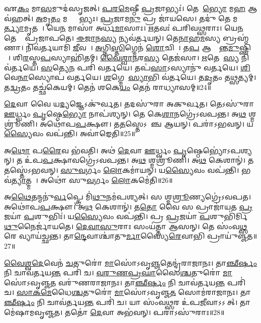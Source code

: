 𑌏\ul{𑌕𑌂} 𑌮𑌾\ul{𑌸}𑌮𑍁𑌦॑𑌸𑍃𑌜𑌤𑍍।
\ul{𑌪}\ul{𑌰}\ul{𑌮𑍇}𑌷𑍍𑌠𑍀 \ul{𑌪𑍍𑌰}𑌜𑌾𑌭𑍍𑌯𑌃॑।
𑌤𑍇𑌨𑌾᳚\ul{𑌭𑍍𑌯𑍋} 𑌮\ul{𑌹} 𑌆𑌵॑𑌹𑌤𑍍।
\ul{𑌅}𑌮𑍃\ul{𑌤𑌂} 𑌮𑌰𑍍𑌤𑍍𑌯𑌾᳚𑌭𑍍𑌯𑌃।
\ul{𑌪𑍍𑌰}𑌜𑌾𑌮\ul{𑌨𑍁} 𑌪𑍍𑌰 𑌜𑌾॑𑌯𑌸𑍇।
𑌤𑌦𑍁॑ 𑌤𑍇 𑌮\ul{𑌰𑍍𑌤𑍍𑌯𑌾}𑌮𑍃𑌤𑌮𑍍᳚।
𑌯𑍇\ul{𑌨} 𑌮𑌾𑌸𑌾॑ 𑌅𑌰𑍍𑌧\ul{𑌮𑌾}𑌸𑌾𑌃।
\ul{𑌋}𑌤𑌵𑌃॑ 𑌪𑌰𑌿𑌵\ul{𑌥𑍍𑌸}𑌰𑌾𑌃।
𑌯𑍇\ul{𑌨} 𑌤𑍇 𑌤𑍇᳚ 𑌪𑍍𑌰𑌜𑌾𑌪𑌤𑍇।
\ul{𑌈}\ul{𑌜𑌾}𑌨\ul{𑌸𑍍𑌯} 𑌨𑍍𑌯𑌵॑𑌰𑍍𑌤𑌯𑌨𑍍।
𑌤𑍇\ul{𑌨𑌾}𑌹\ul{𑌮}𑌸𑍍𑌯 𑌬𑍍𑌰𑌹𑍍𑌮॑𑌣𑌾।
𑌨𑌿𑌵॑𑌰𑍍𑌤𑌯𑌾𑌮𑌿 \ul{𑌜𑍀}𑌵𑌸𑍇᳚।
\ul{𑌅}𑌗𑍍𑌨𑌿\ul{𑌸𑍍𑌤𑌿}𑌗𑍍𑌮𑍇𑌨॑ \ul{𑌶𑍋}𑌚𑌿𑌷𑌾᳚।
𑌤\ul{𑌪} 𑌆𑌕𑍍𑌰𑌾᳚𑌨𑍍𑌤\ul{𑌮𑍁}𑌷𑍍𑌣𑌿𑌹𑌾᳚।
𑌶𑌿\ul{𑌰}𑌸𑍍𑌤\ul{𑌪}𑌸𑍍𑌯𑌾𑌹𑌿॑𑌤𑌮𑍍।
\ul{𑌵𑍈}\ul{𑌶𑍍𑌵𑌾}\ul{𑌨}𑌰\ul{𑌸𑍍𑌯} 𑌤𑍇𑌜॑𑌸𑌾।
\ul{𑌋}𑌤𑍇𑌨𑌾᳚\ul{𑌸𑍍𑌯} 𑌨𑌿 𑌵॑𑌰𑍍𑌤𑌯𑍇।
\ul{𑌸}𑌤𑍍𑌯𑍇\ul{𑌨} 𑌪𑌰𑌿॑ 𑌵𑌰𑍍𑌤𑌯𑍇।
𑌤𑌪॑\ul{𑌸𑌾}\-𑌽𑌸𑍍𑌯𑌾𑌨𑍁॑ 𑌵𑌰𑍍𑌤𑌯𑍇।
\ul{𑌶𑌿}𑌵𑍇\ul{𑌨𑌾}𑌸𑍍𑌯𑍋𑌪॑ 𑌵𑌰𑍍𑌤𑌯𑍇।
\ul{𑌶}𑌗𑍍𑌮𑍇𑌨𑌾᳚\ul{𑌸𑍍𑌯𑌾}𑌭𑌿 𑌵॑𑌰𑍍𑌤𑌯𑍇।
𑌤\ul{𑌦𑍃}𑌤𑌂 𑌤\ul{𑌥𑍍𑌸}𑌤𑍍𑌯𑌮𑍍।
𑌤\ul{𑌦𑍍𑌵𑍍𑌰}𑌤𑌂 𑌤𑌚𑍍𑌛॑𑌕𑍇𑌯𑌮𑍍।
𑌤𑍇𑌨॑ 𑌶𑌕𑍇\ul{𑌯𑌂} 𑌤𑍇𑌨॑ 𑌰𑌾𑌧𑍍𑌯𑌾𑌸𑌮𑍍॥24॥

\ul{𑌦𑍇}𑌵𑌾 𑌵𑍈 𑌯\ul{𑌦𑍍𑌯}𑌜𑍍𑌞𑍇\-𑌽𑌕𑍁॑𑌰𑍍𑌵𑌤।
𑌤𑌦𑌸𑍁॑𑌰𑌾 𑌅𑌕𑍁𑌰𑍍𑌵𑌤।
𑌤𑍇𑌽𑌸𑍁॑𑌰𑌾 \ul{𑌊}𑌰𑍍𑌧𑍍𑌵𑌂 \ul{𑌪𑍃}𑌷𑍍𑌠𑍇\ul{𑌭𑍍𑌯𑍋} 𑌨𑌾𑌪॑𑌶𑍍𑌯𑌨𑍍।
𑌤𑍇 𑌕𑍇\ul{𑌶𑌾}𑌨𑌗𑍍𑌰𑍇॑\-𑌽𑌵𑌪𑌨𑍍𑌤।
𑌅\ul{𑌥} 𑌶𑍍𑌮𑌶𑍍𑌰𑍂॑𑌣𑌿।
𑌅𑌥𑍋॑𑌪\ul{𑌪}𑌕𑍍𑌷𑍗।
𑌤\ul{𑌤}𑌸𑍍𑌤𑍇\-𑌽𑌵𑌾᳚𑌞𑍍𑌚 𑌆𑌯𑌨𑍍।
𑌪𑌰𑌾॑𑌽𑌭𑌵𑌨𑍍।
𑌯\ul{𑌸𑍍𑌯𑍈}𑌵𑌂 𑌵𑌪॑𑌨𑍍𑌤𑌿।
𑌅𑌵𑌾॑𑌙𑍇𑌤𑌿॥25॥

𑌅\ul{𑌥𑍋} 𑌪\ul{𑌰𑍈}𑌵 𑌭॑𑌵𑌤𑌿।
𑌅𑌥॑ \ul{𑌦𑍇}𑌵𑌾 \ul{𑌊}𑌰𑍍𑌧𑍍𑌵𑌂 \ul{𑌪𑍃}𑌷𑍍𑌠𑍇𑌭𑍍𑌯𑍋॑\-𑌽𑌪𑌶𑍍𑌯𑌨𑍍।
𑌤 𑌉॑𑌪\ul{𑌪}𑌕𑍍𑌷𑌾𑌵𑌗𑍍𑌰𑍇॑\-𑌽𑌵𑌪𑌨𑍍𑌤।
𑌅\ul{𑌥} 𑌶𑍍𑌮𑌶𑍍𑌰𑍂॑𑌣𑌿।
𑌅\ul{𑌥} 𑌕𑍇𑌶𑌾𑌨𑍍॑।
𑌤\ul{𑌤}𑌸𑍍𑌤𑍇॑\-𑌽𑌭𑌵𑌨𑍍।
\ul{𑌸𑍁}\ul{𑌵}𑌰𑍍𑌗𑌂 \ul{𑌲𑍋}𑌕𑌮𑌾॑𑌯𑌨𑍍।
𑌯\ul{𑌸𑍍𑌯𑍈}𑌵𑌂 𑌵𑌪॑𑌨𑍍𑌤𑌿।
𑌭𑌵॑\ul{𑌤𑍍𑌯𑌾}𑌤𑍍𑌮𑌨𑌾᳚।
𑌅𑌥𑍋॑ 𑌸𑍁\ul{𑌵}𑌰𑍍𑌗𑌂 \ul{𑌲𑍋}𑌕𑌮𑍇॑𑌤𑌿॥26॥

𑌅\ul{𑌥𑍈}𑌤𑌨𑍍𑌮𑌨𑍁॑\ul{𑌰𑍍𑌵}𑌪𑍍𑌤𑍍𑌰𑍇 𑌮𑌿॑\ul{𑌥𑍁}𑌨𑌮॑𑌪𑌶𑍍𑌯𑌤𑍍।
𑌸 𑌶𑍍𑌮\ul{𑌶𑍍𑌰𑍂}𑌣𑍍𑌯𑌗𑍍𑌰𑍇॑𑌽𑌵𑌪𑌤।
𑌅𑌥𑍋॑𑌪\ul{𑌪}𑌕𑍍𑌷𑍗।
𑌅\ul{𑌥} 𑌕𑍇𑌶𑌾𑌨𑍍॑।
𑌤\ul{𑌤𑍋} 𑌵𑍈 𑌸 𑌪𑍍𑌰𑌾𑌜𑌾॑𑌯𑌤 \ul{𑌪𑍍𑌰}𑌜𑌯𑌾॑ \ul{𑌪}𑌶𑍁𑌭𑌿𑌃॑।
𑌯\ul{𑌸𑍍𑌯𑍈}𑌵𑌂 𑌵𑌪॑𑌨𑍍𑌤𑌿।
𑌪𑍍𑌰 \ul{𑌪𑍍𑌰}𑌜𑌯𑌾॑ \ul{𑌪}𑌶𑍁𑌭𑌿॑𑌰𑍍𑌮𑌿\ul{𑌥𑍁}𑌨𑍈𑌰𑍍𑌜𑌾॑𑌯𑌤𑍇।
\ul{𑌦𑍇}\ul{𑌵𑌾}\ul{𑌸𑍁}𑌰𑌾𑌃 𑌸𑌂𑌯॑𑌤𑍍𑌤𑌾 𑌆𑌸𑌨𑍍।
𑌤𑍇 𑌸𑌂॑𑌵\ul{𑌥𑍍𑌸}𑌰𑍇 𑌵𑍍𑌯𑌾𑌯॑𑌚𑍍𑌛𑌨𑍍𑌤।
𑌤𑌾\ul{𑌨𑍍𑌦𑍇}𑌵𑌾𑌶𑍍𑌚𑌾॑𑌤𑍁\ul{𑌰𑍍𑌮𑌾}𑌸𑍍𑌯𑍈\ul{𑌰𑍇}𑌵𑌾𑌭𑌿 𑌪𑍍𑌰𑌾𑌯𑍁॑𑌞𑍍𑌜𑌤॥27॥

\ul{𑌵𑍈}\ul{𑌶𑍍𑌵}\ul{𑌦𑍇}𑌵𑍇𑌨॑ \ul{𑌚}𑌤𑍁𑌰𑍋॑ \ul{𑌮𑌾}𑌸𑍋॑\-𑌽𑌵𑍃\ul{𑌞𑍍𑌜}𑌤𑍇𑌨𑍍𑌦𑍍𑌰॑𑌰𑌾𑌜𑌾𑌨𑌃।
𑌤𑌾\ul{𑌞𑍍𑌛𑍀}\ul{𑌰𑍍}𑌷𑌂 𑌨𑌿 𑌚𑌾𑌵॑𑌰𑍍𑌤𑌯\ul{𑌨𑍍𑌤} 𑌪𑌰𑌿॑ 𑌚।
\ul{𑌵}\ul{𑌰𑍁}\ul{𑌣}\ul{𑌪𑍍𑌰}\ul{𑌘𑌾}𑌸𑍈\ul{𑌶𑍍𑌚}𑌤𑍁𑌰𑍋॑ \ul{𑌮𑌾}𑌸𑍋॑\-𑌽𑌵𑍃𑌞𑍍𑌜\ul{𑌤} 𑌵𑌰𑍁॑𑌣𑌰𑌾𑌜𑌾𑌨𑌃।
𑌤𑌾\ul{𑌞𑍍𑌛𑍀}\ul{𑌰𑍍}𑌷𑌂 𑌨𑌿 𑌚𑌾𑌵॑𑌰𑍍𑌤𑌯\ul{𑌨𑍍𑌤} 𑌪𑌰𑌿॑ 𑌚।
\ul{𑌸𑌾}\ul{𑌕}\ul{𑌮𑍇}𑌧𑍈\ul{𑌶𑍍𑌚}𑌤𑍁𑌰𑍋॑ \ul{𑌮𑌾}𑌸𑍋॑\-𑌽𑌵𑍃𑌞𑍍𑌜\ul{𑌤} 𑌸𑍋𑌮॑𑌰𑌾𑌜𑌾𑌨𑌃।
𑌤𑌾\ul{𑌞𑍍𑌛𑍀}\ul{𑌰𑍍}𑌷𑌂 𑌨𑌿 𑌚𑌾𑌵॑𑌰𑍍𑌤𑌯\ul{𑌨𑍍𑌤} 𑌪𑌰𑌿॑ 𑌚।
𑌯𑌾 𑌸𑌂॑𑌵\ul{𑌥𑍍𑌸}𑌰 𑌉॑𑌪\ul{𑌜𑍀}𑌵𑌾\-𑌽𑌽𑌸𑍀᳚𑌤𑍍।
𑌤𑌾𑌮𑍇॑𑌷𑌾𑌮𑌵𑍃𑌞𑍍𑌜𑌤।
𑌤𑌤𑍋॑ \ul{𑌦𑍇}𑌵𑌾 𑌅𑌭॑𑌵𑌨𑍍।
𑌪𑌰𑌾𑌽𑌸𑍁॑𑌰𑌾𑌃॥28॥

